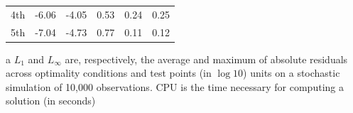 \begin{table}[tph]
\begin{center}
\begin{threeparttable}
{\begin{tabular}{c|cc|ccc}
    4th & -6.06 & -4.05 & 0.53 & 0.24 & 0.25 \\
    5th & -7.04 & -4.73 & 0.77 & 0.11 & 0.12 \\ \hline
    \end{tabular}
  \begin{tablenotes}
    \item[a] $L_1$ and $L_\infty$ are, respectively, the average and maximum of
    absolute residuals across optimality conditions and test points (in $\log
    10$) units on a stochastic simulation of 10,000 observations. CPU is the
    time necessary for computing a solution (in seconds)
  \end{tablenotes}
}  %
  \end{threeparttable}
  \end{center}
  \par
\end{table}

